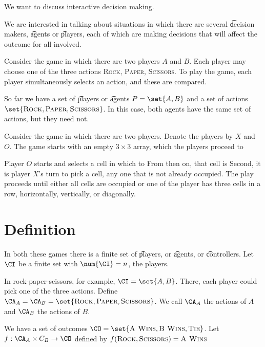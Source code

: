 

We want to discuss interactive decision making.


We are interested in talking about situations in which there are several \t{decision makers}, \t{agents} or \t{players}, each of which are making decisions that will affect the outcome for all involved.

Consider the game  in which there are two players $A$ and $B$.
Each player may choose one of the three actions \textsc{Rock}, \textsc{Paper}, \textsc{Scissors}.
To play the game, each player simultaneously selects an action, and these are compared.

So far we have a set of \t{players} or \t{agents} $P = \set{A, B}$ and a set of actions $\set{\textsc{Rock}, \textsc{Paper}, \textsc{Scissors}}$.
In this case, both agents have the same set of actions, but they need not.


Consider the game  in which there are two players. 
Denote the players by $X$ and $O$.
The game starts with an empty $3 \times 3$ array, which the players proceed to 

Player $O$ starts and selects a cell in which to 
From then on, that cell is 
Second, it is player $X$'s turn to pick a cell, any one that is not already occupied.
The play proceeds until either all cells are occupied or one of the player has three cells in a row, horizontally, vertically, or diagonally.

\section{Definition}

In both these games there is a finite set of \t{players}, or \t{agents}, or \t{controllers}.
Let $\CI$ be a finite set with $\num{\CI} = n$, the players.

In rock-paper-scissors, for example, $\CI = \set{A, B}$. 
There, each player could pick one of the three actions.
Define $\CA_A = \CA_B = \set{\textsc{Rock}, \textsc{Paper}, \textsc{Scissors}}$.
We call $\CA_A$ the actions of $A$ and $\CA_B$ the actions of $B$.

We have a set of outcomes $\CO = \set{\textsc{A Wins}, \textsc{B Wins}, \textsc{Tie}}$.
Let $f: \CA_A \times C_B \to \CO$ defined by $f(\textsc{Rock}, \textsc{Scissors}) = \textsc{A Wins}$

